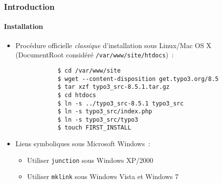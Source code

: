 \begin{frame}[fragile]
	\frametitle{Introduction}
	\framesubtitle{Installation}

	\begin{itemize}
		\item Procédure officielle \textit{classique} d'installation sous Linux/Mac OS X\newline
			(DocumentRoot considéré \texttt{/var/www/site/htdocs})~:
		\begin{lstlisting}
			$ cd /var/www/site
			$ wget --content-disposition get.typo3.org/8.5
			$ tar xzf typo3_src-8.5.1.tar.gz
			$ cd htdocs
			$ ln -s ../typo3_src-8.5.1 typo3_src
			$ ln -s typo3_src/index.php
			$ ln -s typo3_src/typo3
			$ touch FIRST_INSTALL
		\end{lstlisting}

		\item Liens symboliques sous Microsoft Windows~:

			\begin{itemize}
				\item Utiliser \texttt{junction} sous Windows XP/2000
				\item Utiliser \texttt{mklink} sous Windows Vista et Windows 7
			\end{itemize}

	\end{itemize}
\end{frame}

